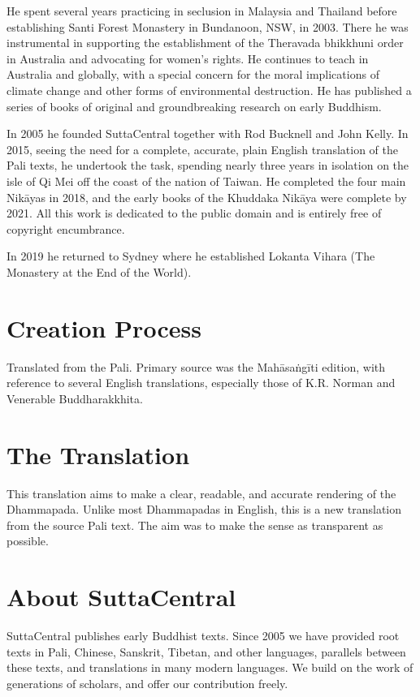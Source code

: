 \documentclass[12pt,openany]{book}%
\begin{document}
He spent several years practicing in seclusion in Malaysia and Thailand before establishing Santi Forest Monastery in Bundanoon, NSW, in 2003. There he was instrumental in supporting the establishment of the Theravada bhikkhuni order in Australia and advocating for women’s rights. He continues to teach in Australia and globally, with a special concern for the moral implications of climate change and other forms of environmental destruction. He has published a series of books of original and groundbreaking research on early Buddhism. 

In 2005 he founded SuttaCentral together with Rod Bucknell and John Kelly. In 2015, seeing the need for a complete, accurate, plain English translation of the Pali texts, he undertook the task, spending nearly three years in isolation on the isle of Qi Mei off the coast of the nation of Taiwan. He completed the four main \textsanskrit{Nikāyas} in 2018, and the early books of the Khuddaka \textsanskrit{Nikāya} were complete by 2021. All this work is dedicated to the public domain and is entirely free of copyright encumbrance. 

In 2019 he returned to Sydney where he established Lokanta Vihara (The Monastery at the End of the World). 

\section*{Creation Process}

Translated from the Pali. Primary source was the \textsanskrit{Mahāsaṅgīti} edition, with reference to several English translations, especially those of K.R. Norman and Venerable Buddharakkhita.

\section*{The Translation}

This translation aims to make a clear, readable, and accurate rendering of the Dhammapada. Unlike most Dhammapadas in English, this is a new translation from the source Pali text. The aim was to make the sense as transparent as possible.

\section*{About SuttaCentral}

SuttaCentral publishes early Buddhist texts. Since 2005 we have provided root texts in Pali, Chinese, Sanskrit, Tibetan, and other languages, parallels between these texts, and translations in many modern languages. We build on the work of generations of scholars, and offer our contribution freely.
\end{document}
